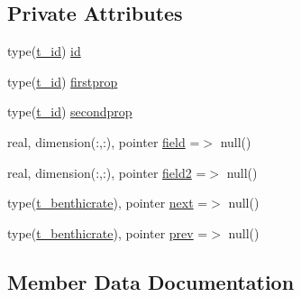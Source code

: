 \subsection*{Private Attributes}
\begin{DoxyCompactItemize}
\item 
type(\mbox{\hyperlink{structmoduleinterfacesedimentwater_1_1t__id}{t\+\_\+id}}) \mbox{\hyperlink{structmoduleinterfacesedimentwater_1_1t__benthicrate_a79dce5eb34983e97703f8cccb701cf8d}{id}}
\item 
type(\mbox{\hyperlink{structmoduleinterfacesedimentwater_1_1t__id}{t\+\_\+id}}) \mbox{\hyperlink{structmoduleinterfacesedimentwater_1_1t__benthicrate_a333a9210e674281925afc9440680b35d}{firstprop}}
\item 
type(\mbox{\hyperlink{structmoduleinterfacesedimentwater_1_1t__id}{t\+\_\+id}}) \mbox{\hyperlink{structmoduleinterfacesedimentwater_1_1t__benthicrate_a22b791229738b058c81232ca4750e133}{secondprop}}
\item 
real, dimension(\+:,\+:), pointer \mbox{\hyperlink{structmoduleinterfacesedimentwater_1_1t__benthicrate_a1e3dc7dd449ceec5ed666c036dfe9752}{field}} =$>$ null()
\item 
real, dimension(\+:,\+:), pointer \mbox{\hyperlink{structmoduleinterfacesedimentwater_1_1t__benthicrate_a23f8be812786d9883a2410e1c9b18f8c}{field2}} =$>$ null()
\item 
type(\mbox{\hyperlink{structmoduleinterfacesedimentwater_1_1t__benthicrate}{t\+\_\+benthicrate}}), pointer \mbox{\hyperlink{structmoduleinterfacesedimentwater_1_1t__benthicrate_afdd51241a631bce3f5201b7f04a4a46d}{next}} =$>$ null()
\item 
type(\mbox{\hyperlink{structmoduleinterfacesedimentwater_1_1t__benthicrate}{t\+\_\+benthicrate}}), pointer \mbox{\hyperlink{structmoduleinterfacesedimentwater_1_1t__benthicrate_a4a632e6c3a8c184dc265f46cf207703a}{prev}} =$>$ null()
\end{DoxyCompactItemize}


\subsection{Member Data Documentation}
\mbox{\label{structmoduleinterfacesedimentwater_1_1t__benthicrate_a1e3dc7dd449ceec5ed666c036dfe9752}} 
